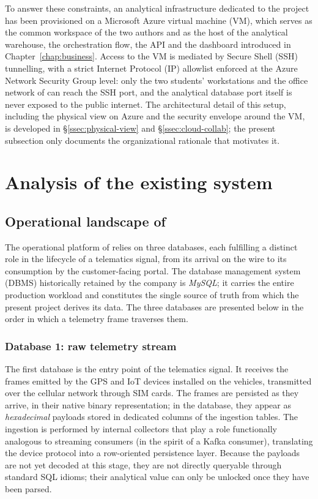 To answer these constraints, an analytical infrastructure dedicated to the project has been provisioned on a Microsoft Azure virtual machine (VM), which serves as the common workspace of the two authors and as the host of the analytical warehouse, the orchestration flow, the API and the dashboard introduced in Chapter~\ref{chap:business}. Access to the VM is mediated by Secure Shell (SSH) tunnelling, with a strict Internet Protocol (IP) allowlist enforced at the Azure Network Security Group level: only the two students' workstations and the office network of \hostorg{} can reach the SSH port, and the analytical database port itself is never exposed to the public internet. The architectural detail of this setup, including the physical view on Azure and the security envelope around the VM, is developed in §\ref{ssec:physical-view} and §\ref{ssec:cloud-collab}; the present subsection only documents the organizational rationale that motivates it.

\section{Analysis of the existing system}

\subsection{Operational landscape of \hostorg}
The operational platform of \hostorg{} relies on three databases, each fulfilling a distinct role in the lifecycle of a telematics signal, from its arrival on the wire to its consumption by the customer-facing portal. The database management system (DBMS) historically retained by the company is \emph{MySQL}; it carries the entire production workload and constitutes the single source of truth from which the present project derives its data. The three databases are presented below in the order in which a telemetry frame traverses them.

\subsubsection{Database 1: raw telemetry stream}
The first database is the entry point of the telematics signal. It receives the frames emitted by the GPS and IoT devices installed on the vehicles, transmitted over the cellular network through SIM cards. The frames are persisted as they arrive, in their native binary representation; in the database, they appear as \emph{hexadecimal} payloads stored in dedicated columns of the ingestion tables. The ingestion is performed by internal collectors that play a role functionally analogous to streaming consumers (in the spirit of a Kafka consumer), translating the device protocol into a row-oriented persistence layer. Because the payloads are not yet decoded at this stage, they are not directly queryable through standard SQL idioms; their analytical value can only be unlocked once they have been parsed.

